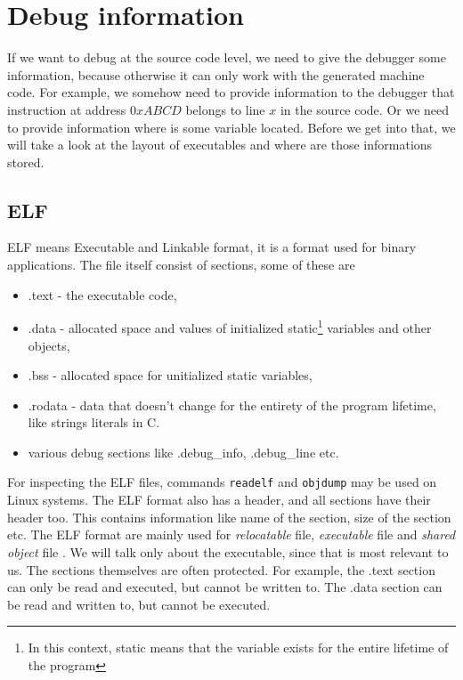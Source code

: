 \section{Debug information}
If we want to debug at the source code level, we need to give the debugger some
information, because otherwise it can only work with the generated machine
code. For example, we somehow need to provide information to the debugger that
instruction at address $0xABCD$ belongs to line $x$ in the source code. Or we
need to provide information where is some variable located. Before we get into
that, we will take a look at the layout of executables and where are those
informations stored.

\subsection{ELF}
ELF means Executable and Linkable format, it is a format used for binary
applications. The file itself consist of sections, some of these are
\begin{itemize}
    \item .text - the executable code,
    \item .data - allocated space and values of initialized static\footnote{In
        this context, static means that the variable exists for the entire
        lifetime of the program} variables and other objects,
    \item .bss - allocated space for unitialized static variables,
    \item .rodata - data that doesn't change for the entirety of the program
        lifetime, like strings literals in C.
    \item various debug sections like .debug\_info, .debug\_line etc.
\end{itemize}
For inspecting the ELF files, commands \texttt{readelf} and \texttt{objdump}
may be used on Linux systems. The ELF format also has a header, and all
sections have their header too. This contains information like name of the
section, size of the section etc. The ELF format are mainly used for
\textit{relocatable} file, \textit{executable} file and \textit{shared object}
file \cite{elf}. We will talk only about the executable, since that is most
relevant to us. The sections themselves are often protected. For example, the .text section
can only be read and executed, but cannot be written to. The .data section
can be read and written to, but cannot be executed.


